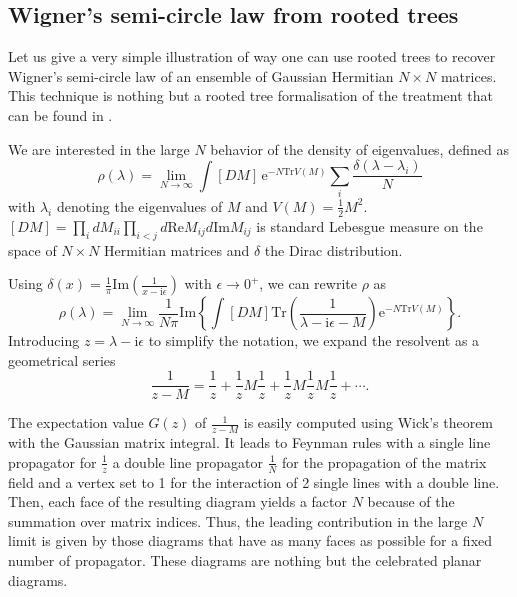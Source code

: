\documentclass[12pt,here,feynmf]{article}
\begin{document}
\subsection{Wigner's semi-circle law from rooted trees}

Let us give a very simple illustration of way one can use rooted trees to recover Wigner's semi-circle law of an ensemble of Gaussian Hermitian $N\times N$ matrices. This technique is nothing but  a rooted tree formalisation of the treatment that can be found in \cite{zee}. 

We are interested in the large $N$ behavior of the density of eigenvalues, defined as
\begin{equation}
\rho(\lambda)=\lim_{N\rightarrow\infty}\int [DM]\,\mathrm{e}^{-N\mathrm{Tr}V(M)}
\sum_{i}\frac{\delta(\lambda-\lambda_{i})}{N}
\end{equation}
with $\lambda_{i}$ denoting the eigenvalues of $M$ and $V(M)=\frac{1}{2}M^{2}$. $[DM]=\prod_{i}dM_{ii}\prod_{i<j}d\mathrm{Re}M_{ij}d\mathrm{Im}M_{ij}$ is standard Lebesgue measure on the space of $N\times N$ Hermitian matrices and $\delta$ the Dirac distribution.

Using $\delta(x)=\frac{1}{\pi}\mathrm{Im}\left(\frac{1}{x-\mathrm{i}\epsilon}\right)$ with $\epsilon\rightarrow 0^{+}$, we can rewrite $\rho$ as
\begin{equation}
\rho(\lambda)=\lim_{N\rightarrow\infty}\frac{1}{N\pi}\mathrm{Im}\left\{
\int [DM]\mathrm{Tr}\left(\frac{1}{\lambda-\mathrm{i}\epsilon-M}
\right)
\mathrm{e}^{-N\mathrm{Tr}V(M)}\right\}.
\end{equation}
Introducing $z=\lambda-\mathrm{i}\epsilon$ to simplify the notation, we expand the resolvent as a geometrical series 
\begin{equation} 
\frac{1}{z-M}=\frac{1}{z}+\frac{1}{z}M\frac{1}{z}+\frac{1}{z}M\frac{1}{z}M\frac{1}{z}+\cdots.
\end{equation}


The expectation value $G(z)$ of  $\frac{1}{z-M}$ is easily computed using Wick's theorem with the Gaussian matrix integral. It leads to Feynman rules with a single line propagator for $\frac{1}{z}$ a double line propagator $\frac{1}{N}$ for the propagation of the matrix field and a vertex set to 1 for the interaction of 2 single lines with a double line. Then, each face of the resulting diagram yields a factor $N$ because of the summation over matrix indices. Thus, the leading contribution in the large $N$ limit is given by those diagrams that have as many faces as possible for a fixed number of propagator. These diagrams are nothing but the celebrated planar diagrams.
\end{document}
